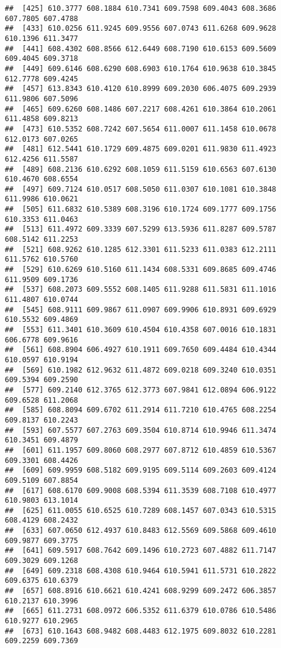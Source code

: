 \documentclass[
]{article}
\begin{document}
\begin{verbatim}
##  [425] 610.3777 608.1884 610.7341 609.7598 609.4043 608.3686 607.7805 607.4788
##  [433] 610.0256 611.9245 609.9556 607.0743 611.6268 609.9628 610.1396 611.3477
##  [441] 608.4302 608.8566 612.6449 608.7190 610.6153 609.5609 609.4045 609.3718
##  [449] 609.6146 608.6290 608.6903 610.1764 610.9638 610.3845 612.7778 609.4245
##  [457] 613.8343 610.4120 610.8999 609.2030 606.4075 609.2939 611.9806 607.5096
##  [465] 609.6260 608.1486 607.2217 608.4261 610.3864 610.2061 611.4858 609.8213
##  [473] 610.5352 608.7242 607.5654 611.0007 611.1458 610.0678 612.0173 607.0265
##  [481] 612.5441 610.1729 609.4875 609.0201 611.9830 611.4923 612.4256 611.5587
##  [489] 608.2136 610.6292 608.1059 611.5159 610.6563 607.6130 610.4670 608.6554
##  [497] 609.7124 610.0517 608.5050 611.0307 610.1081 610.3848 611.9986 610.0621
##  [505] 611.6832 610.5389 608.3196 610.1724 609.1777 609.1756 610.3353 611.0463
##  [513] 611.4972 609.3339 607.5299 613.5936 611.8287 609.5787 608.5142 611.2253
##  [521] 608.9262 610.1285 612.3301 611.5233 611.0383 612.2111 611.5762 610.5760
##  [529] 610.6269 610.5160 611.1434 608.5331 609.8685 609.4746 611.9509 609.1736
##  [537] 608.2073 609.5552 608.1405 611.9288 611.5831 611.1016 611.4807 610.0744
##  [545] 608.9111 609.9867 611.0907 609.9906 610.8931 609.6929 610.5532 609.4869
##  [553] 611.3401 610.3609 610.4504 610.4358 607.0016 610.1831 606.6778 609.9616
##  [561] 608.8904 606.4927 610.1911 609.7650 609.4484 610.4344 610.0597 610.9194
##  [569] 610.1982 612.9632 611.4872 609.0218 609.3240 610.0351 609.5394 609.2590
##  [577] 609.2140 612.3765 612.3773 607.9841 612.0894 606.9122 609.6528 611.2068
##  [585] 608.8094 609.6702 611.2914 611.7210 610.4765 608.2254 609.8137 610.2243
##  [593] 607.5577 607.2763 609.3504 610.8714 610.9946 611.3474 610.3451 609.4879
##  [601] 611.1957 609.8060 608.2977 607.8712 610.4859 610.5367 609.3301 608.4426
##  [609] 609.9959 608.5182 609.9195 609.5114 609.2603 609.4124 609.5109 607.8854
##  [617] 608.6170 609.9008 608.5394 611.3539 608.7108 610.4977 610.9803 613.1014
##  [625] 611.0055 610.6525 610.7289 608.1457 607.0343 610.5315 608.4129 608.2432
##  [633] 607.0650 612.4937 610.8483 612.5569 609.5868 609.4610 609.9877 609.3775
##  [641] 609.5917 608.7642 609.1496 610.2723 607.4882 611.7147 609.3029 609.1268
##  [649] 609.2318 608.4308 610.9464 610.5941 611.5731 610.2822 609.6375 610.6379
##  [657] 608.8916 610.6621 610.4241 608.9299 609.2472 606.3857 610.2137 610.3996
##  [665] 611.2731 608.0972 606.5352 611.6379 610.0786 610.5486 610.9277 610.2965
##  [673] 610.1643 608.9482 608.4483 612.1975 609.8032 610.2281 609.2259 609.7369

\end{verbatim}
\end{document}
